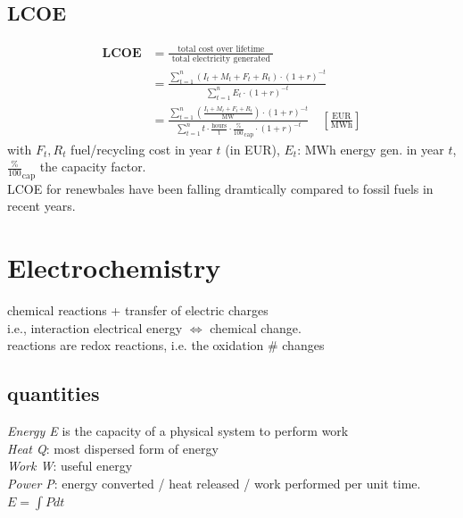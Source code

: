 \documentclass[a4paper,10pt,landscape]{scrartcl}
\begin{document}
\begin{multicols*}{3}
\subsection{LCOE}
$$
\begin{aligned}
\mathbf{L C O E} & =\frac{\text { total cost over lifetime }}{\text { total electricity generated }} \\ 
& =\frac{\sum_{t=1}^n\left(I_t+M_t+F_t+R_t\right) \cdot(1+r)^{-t}}{\sum_{t=1}^n E_t \cdot(1+r)^{-t}} \\
& =\frac{\sum_{t=1}^n\left(\frac{I_t+M_t+F_t+R_t}{\mathrm{MW}}\right) \cdot(1+r)^{-t}}{\sum_{t=1}^n t\cdot \mathrm{\frac{hours}{t}}\cdot \frac{\%}{100}_\mathrm{cap} \cdot(1+r)^{-t}} \quad \mathrm{\left[\frac{EUR}{MWh}\right]}
\end{aligned}
$$
with $F_t, R_t$ fuel/recycling cost in year $t$ (in EUR), $E_t$: $\mathrm{MWh}$ energy gen. in year $t$, $\frac{\%}{100}_\mathrm{cap}$ the capacity factor. \\
LCOE for renewbales have been falling dramtically compared to fossil fuels in recent years.

\section{Electrochemistry}
chemical reactions + transfer of electric charges\\
i.e., interaction electrical energy $\Leftrightarrow$ chemical change. \\
reactions are redox reactions, i.e. the oxidation \# changes
\subsection{quantities}
\textit{Energy E} is the capacity of a physical system to perform work\\
\textit{Heat Q}: most dispersed form of energy \\
\textit{Work W}: useful energy \\
\textit{Power P}: energy converted / heat released /  work performed per unit time. $E=\int Pdt$

\end{multicols*}
\end{document}
